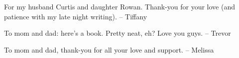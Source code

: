 
\thispagestyle{empty}

\begin{center}
For my husband Curtis and daughter Rowan. Thank-you for your love 
\linebreak(and patience with my late night writing).
\linebreak-- Tiffany

To mom and dad: here's a book. Pretty neat, eh? Love you guys.
\linebreak-- Trevor

To mom and dad, thank-you for all your love and support.
\linebreak-- Melissa
\end{center}

\setlength{\abovedisplayskip}{-5pt}
\setlength{\abovedisplayshortskip}{-5pt}
